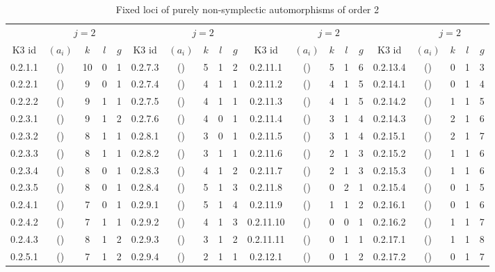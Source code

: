 {\small\centering\setlength{\tabcolsep}{3pt}
\begin{longtable}{ccccc|ccccc|ccccc|ccccc}
\caption{Fixed loci of purely non-symplectic automorphisms of order 2}\\
 & \multicolumn{4}{c}{$j = 2$} & & \multicolumn{4}{c}{$j = 2$} & & \multicolumn{4}{c}{$j = 2$} & & \multicolumn{4}{c}{$j = 2$}\\
\cmidrule(lr){2-5}
\cmidrule(lr){7-10}
\cmidrule(lr){12-15}
\cmidrule(lr){17-20}
K3 id & $(a_i)$ & $k$ & $l$ & $g$ & K3 id & $(a_i)$ & $k$ & $l$ & $g$ & K3 id & $(a_i)$ & $k$ & $l$ & $g$ & K3 id & $(a_i)$ & $k$ & $l$ & $g$\\
\hline
\endhead
\rowcolor{lightgray}
0.2.1.1 & () & 10 & 0 & 1 & 0.2.7.3 & () & 5 & 1 & 2 & 0.2.11.1 & () & 5 & 1 & 6 & 0.2.13.4 & () & 0 & 1 & 3\\
0.2.2.1 & () & 9 & 0 & 1 & 0.2.7.4 & () & 4 & 1 & 1 & 0.2.11.2 & () & 4 & 1 & 5 & 0.2.14.1 & () & 0 & 1 & 4\\
\rowcolor{lightgray}
0.2.2.2 & () & 9 & 1 & 1 & 0.2.7.5 & () & 4 & 1 & 1 & 0.2.11.3 & () & 4 & 1 & 5 & 0.2.14.2 & () & 1 & 1 & 5\\
0.2.3.1 & () & 9 & 1 & 2 & 0.2.7.6 & () & 4 & 0 & 1 & 0.2.11.4 & () & 3 & 1 & 4 & 0.2.14.3 & () & 2 & 1 & 6\\
\rowcolor{lightgray}
0.2.3.2 & () & 8 & 1 & 1 & 0.2.8.1 & () & 3 & 0 & 1 & 0.2.11.5 & () & 3 & 1 & 4 & 0.2.15.1 & () & 2 & 1 & 7\\
0.2.3.3 & () & 8 & 1 & 1 & 0.2.8.2 & () & 3 & 1 & 1 & 0.2.11.6 & () & 2 & 1 & 3 & 0.2.15.2 & () & 1 & 1 & 6\\
\rowcolor{lightgray}
0.2.3.4 & () & 8 & 0 & 1 & 0.2.8.3 & () & 4 & 1 & 2 & 0.2.11.7 & () & 2 & 1 & 3 & 0.2.15.3 & () & 1 & 1 & 6\\
0.2.3.5 & () & 8 & 0 & 1 & 0.2.8.4 & () & 5 & 1 & 3 & 0.2.11.8 & () & 0 & 2 & 1 & 0.2.15.4 & () & 0 & 1 & 5\\
\rowcolor{lightgray}
0.2.4.1 & () & 7 & 0 & 1 & 0.2.9.1 & () & 5 & 1 & 4 & 0.2.11.9 & () & 1 & 1 & 2 & 0.2.16.1 & () & 0 & 1 & 6\\
0.2.4.2 & () & 7 & 1 & 1 & 0.2.9.2 & () & 4 & 1 & 3 & 0.2.11.10 & () & 0 & 0 & 1 & 0.2.16.2 & () & 1 & 1 & 7\\
\rowcolor{lightgray}
0.2.4.3 & () & 8 & 1 & 2 & 0.2.9.3 & () & 3 & 1 & 2 & 0.2.11.11 & () & 0 & 1 & 1 & 0.2.17.1 & () & 1 & 1 & 8\\
0.2.5.1 & () & 7 & 1 & 2 & 0.2.9.4 & () & 2 & 1 & 1 & 0.2.12.1 & () & 0 & 1 & 2 & 0.2.17.2 & () & 0 & 1 & 7\\

\end{longtable}}
